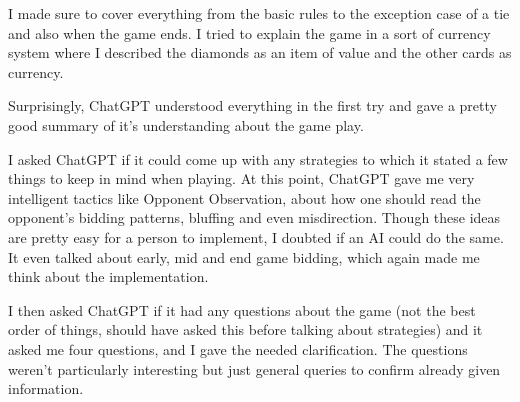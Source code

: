 \documentclass{article}
\begin{document}
I made sure to cover everything from the basic rules to the exception case of a tie and also when the game ends. I tried to explain the game in a sort of currency system where I described the diamonds as an item of value and the other cards as currency.

Surprisingly, ChatGPT understood everything in the first try and gave a pretty good summary of it's understanding about the game play.

I asked ChatGPT if it could come up with any strategies to which it stated a few things to keep in mind when playing. At this point, ChatGPT gave me very intelligent tactics like Opponent Observation, about how one should read the opponent's bidding patterns, bluffing and even misdirection. Though these ideas are pretty easy for a person to implement, I doubted if an AI could do the same. It even talked about early, mid and end game bidding, which again made me think about the implementation. 

I then asked ChatGPT if it had any questions about the game (not the best order of things, should have asked this before talking about strategies) and it asked me four questions, and I gave the needed clarification. The questions weren't particularly interesting but just general queries to confirm already given information.
\end{document}
